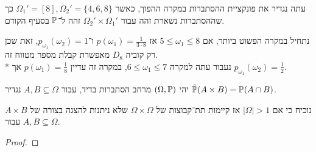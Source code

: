 \Subquestion{}
עתה נגדיר את פונקציית ההסתברות במקרה ההפוך, כאשר $\Omega_1' = [8], \Omega_2' = \{4, 6, 8\}$ כך שההסתברות נשארת זהה עבור $\Omega_2' \times \Omega_1'$ זהה ל־$\mathbb{P}$ בסעיף הקודם.
\begin{solution}
	נתחיל במקרה הפשוט ביותר, אם $5 \le \omega_1 \le 8$ אז $p(\omega_1) = \frac{1}{3 \cdot 8}$ ו־$p_{\omega_1}(\omega_2) = 1$,
	זאת שכן רק קוביה $D_8$ מאפשרת קבלת מספר מטווח זה. \\*
	נעבור עתה למקרה $6 \le \omega_1 \le 7$, במקרה זה עדיין $p(\omega_1) = \frac{1}{8}$ אך $p_{\omega_1}(\omega_2) = \frac{1}{2}$.
\end{solution}

\Question{}
יהי $(\Omega, \mathbb{P})$ מרחב הסתברות בדיד, עבור $A, B \subseteq \Omega$ נגדיר $\tilde{\mathbb{P}}(A \times B) = \mathbb{P}(A \cap B)$.

\Subquestion{}
נוכיח כי אם $|\Omega| > 1$ אז קיימות תת־קבוצות של $\Omega \times \Omega$ שלא ניתנות להצגה בצורה של $A \times B$ עבור $A, B \subseteq \Omega$.
\begin{proof}
	
\end{proof}


